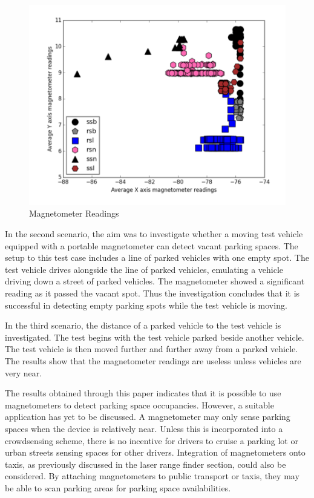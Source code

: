 \begin{figure}[H]
    \centering
    \includegraphics[width=0.75\linewidth]{./Images/MAGNETOMETER.PNG}
    \caption{Magnetometer Readings}
    \label{figure:magnetometer}
\end{figure}

In the second scenario, the aim was to investigate whether a moving test vehicle equipped with a portable magnetometer can detect vacant parking spaces. The setup to this test case includes a line of parked vehicles with one empty spot. The test vehicle drives alongside the line of parked vehicles, emulating a vehicle driving down a street of parked vehicles. The magnetometer showed a significant reading as it passed the vacant spot. Thus the investigation concludes that it is successful in detecting empty parking spots while the test vehicle is moving.

In the third scenario, the distance of a parked vehicle to the test vehicle is investigated. The test begins with the test vehicle parked beside another vehicle. The test vehicle is then moved further and further away from a parked vehicle. The results show that the magnetometer readings are useless unless vehicles are very near.

The results obtained through this paper indicates that it is possible to use magnetometers to detect parking space occupancies. However, a suitable application has yet to be discussed. A magnetometer may only sense parking spaces when the device is relatively near. Unless this is incorporated into a crowdsensing scheme, there is no incentive for drivers to cruise a parking lot or urban streets sensing spaces for other drivers. Integration of magnetometers onto taxis, as previously discussed in the laser range finder section, could also be considered. By attaching magnetometers to public transport or taxis, they may be able to scan parking areas for parking space availabilities.